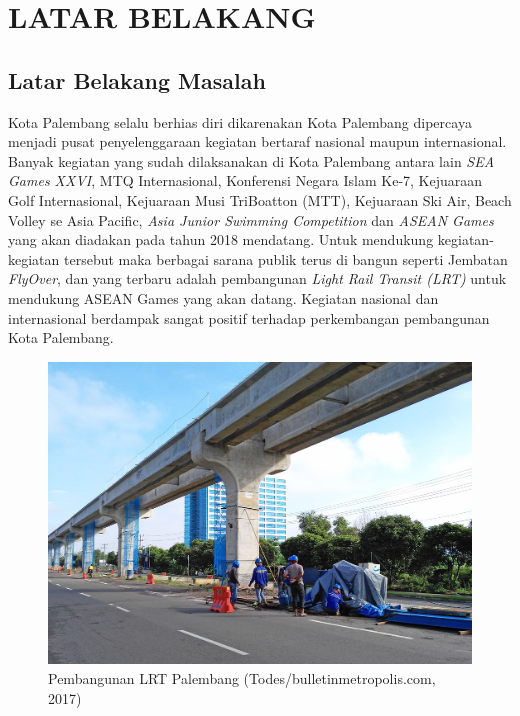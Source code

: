 
\chapter{LATAR BELAKANG}

\section{Latar Belakang Masalah}
Kota Palembang selalu berhias diri dikarenakan Kota Palembang dipercaya menjadi pusat penyelenggaraan kegiatan bertaraf nasional maupun internasional. Banyak kegiatan yang sudah dilaksanakan di Kota Palembang antara lain \emph{SEA Games XXVI}, MTQ Internasional, Konferensi Negara Islam Ke-7, Kejuaraan Golf Internasional, Kejuaraan Musi TriBoatton (MTT), Kejuaraan Ski Air, Beach Volley se Asia Pacific, \emph{Asia Junior Swimming Competition} dan \emph{ASEAN Games} yang akan diadakan pada tahun 2018 mendatang. Untuk mendukung kegiatan-kegiatan tersebut maka berbagai sarana publik terus di bangun seperti Jembatan \emph{FlyOver}, dan yang terbaru adalah pembangunan \emph{Light Rail Transit (LRT)} untuk mendukung ASEAN Games yang akan datang. Kegiatan nasional dan internasional berdampak sangat positif terhadap perkembangan pembangunan Kota Palembang. \\

\begin{figure}[H]
  \centering
    \includegraphics[scale=0.2]{gambar/lrt}
    \caption{Pembangunan LRT Palembang (Todes/bulletinmetropolis.com, 2017)}
    \label{fig:lrt}
\end{figure}

